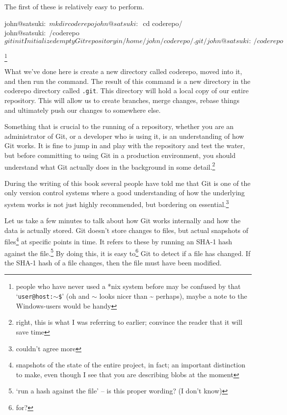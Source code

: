 The first of these is relatively easy to perform.

\begin{code}
john@satsuki:~$ mkdir coderepo
john@satsuki:~$ cd coderepo/
john@satsuki:~/coderepo$ git init
Initialized empty Git repository in /home/john/coderepo/.git/
john@satsuki:~/coderepo$
\end{code}
\footnote{people who have never used a *nix system before may be confused by that `\texttt{user@host:$\sim$\$}' (oh and $\sim$ looks nicer than \textasciitilde{} perhaps), maybe a note to the Windows-users would be handy}

What we've done here is create a new directory called coderepo, moved into it, and then run the  command.
The result of this command is a new directory in the coderepo directory called \texttt{.git}.
This directory will hold a local copy of our entire repository.
This will allow us to create branches, merge changes, rebase things and ultimately push our changes to somewhere else.

Something that is crucial to the running of a repository, whether you are an administrator of Git, or a developer who is using it, is an understanding of how Git works.
It is fine to jump in and play with the repository and test the water, but before committing to using Git in a production environment, you should understand what Git actually does in the background in some detail.\footnote{right, this is what I was referring to earlier; convince the reader that it will save time}

During the writing of this book several people have told me that Git is one of the only version control systems where a good understanding of how the underlying system works is not just highly recommended, but bordering on essential.\footnote{couldn't agree more}

Let us take a few minutes to talk about how Git works internally and how the data is actually stored.
Git doesn't store changes to files, but actual snapshots of files\footnote{snapshots of the state of the entire project, in fact; an important distinction to make, even though I see that you are describing blobs at the moment} at specific points in time.
It refers to these by running an SHA-1 hash against the file.\footnote{`run a hash against the file' -- is this proper wording? (I don't know)}
By doing this, it is easy to\footnote{for?} Git to detect if a file has changed.
If the SHA-1 hash of a file changes, then the file must have been modified.

